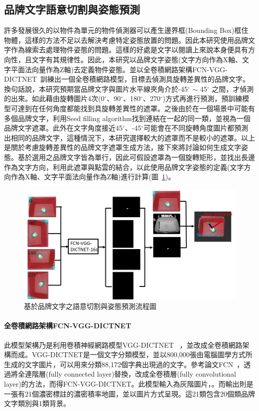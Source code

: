 \subsection{品牌文字語意切割與姿態預測}
許多發展很久的以物件為單元的物件偵測器可以產生邊界框(Bounding Box)框住物體，這樣的方法不足以去解決考慮特定姿態放置的問題。因此本研究使用品牌文字作為線索去處理物件姿態的問題。這樣的好處是文字以閱讀上來說本身便具有方向性，且文字有其規律性。因此，本研究以品牌文字姿態(文字方向作為X軸、文字平面法向量作為Z軸)去定義物件姿態。並以全卷積網路架構FCN-VGG-DICTNET~\cite{peterthesis}訓練出一個全卷積網路模型，目標去偵測具旋轉差異性的品牌文字。換句話說，本研究預期當品牌文字與圖片水平線夾角介於-45$^{\circ}$ $\sim$ 45$^{\circ}$ 之間，才偵測的出來。如此藉由旋轉圖片4次(0$^{\circ}$、90$^{\circ}$、180$^{\circ}$、270$^{\circ}$)方式再進行預測，預訓練模型可達到在任何角度都能找到具旋轉差異性的遮罩。之後由於在一個場景中可能有多個品牌文字，利用Seed filling algorithm找到連結在一起的同一類，並視為一個品牌文字遮罩。此外在文字角度接近45$^{\circ}$、-45$^{\circ}$可能會在不同旋轉角度圖片都預測出相同的品牌文字，這種情況下，本研究選擇較大的遮罩而不是較小的遮罩。以上是關於考慮旋轉差異性的品牌文字遮罩生成方法，接下來將討論如何生成文字姿態。基於選用之品牌文字皆為單行，因此可假設遮罩為一個旋轉矩形，並找出長邊作為文字方向，利用此遮罩與點雲的結合，以此使用品牌文字姿態的定義(文字方向作為X軸、文字平面法向量作為Z軸)進行計算(圖~\ref{figure:text-pose-extimation-pipeline})。

\begin{figure}[ht]
	\centering
	\includegraphics[height=!, width=1.0\linewidth, keepaspectratio=true]
	{./figures/text-pose-extimation-pipeline.jpg}
  \caption{基於品牌文字之語意切割與姿態預測流程圖}
  \label{figure:text-pose-extimation-pipeline}
\end{figure}

\paragraph{全卷積網路架構FCN-VGG-DICTNET}
此模型架構乃是利用卷積神經網路模型VGG-DICTNET ~\cite{jaderberg2014synthetic}，並改成全卷積網路架構而成。VGG-DICTNET是一個文字分類模型，並以800,000張由電腦圖學方式所生成的文字圖片，可以用來分類88,172個字典出現過的文字。參考論文FCN~\cite{long2015fully}，透過將全連階層(fully connected layer)替換，改成全卷積層(fully convolutional layer)的方法，而得FCN-VGG-DICTNET。此模型輸入為灰階圖片，。而輸出則是一張有21個濃密標註的濃密積率地圖，並以圖片方式呈現。這21類包含20個類品牌文字類別與1類背景。

